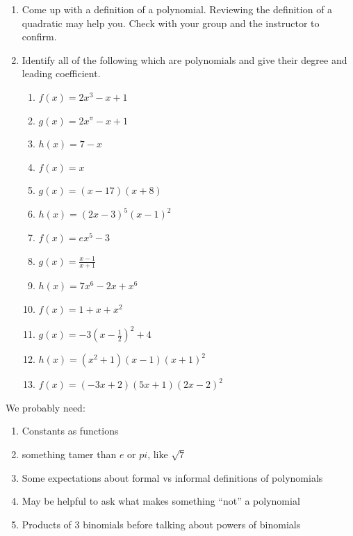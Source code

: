 \documentclass[noauthor]{ximera}
\begin{document}
\begin{problem}
\begin{enumerate}
    \item Come up with a definition of a polynomial. Reviewing the
    definition of a quadratic may help you. Check with your group
    and the instructor to confirm.
    \item Identify all of the following which are polynomials 
    and give their degree and leading coefficient.
    \begin{enumerate}
        \item \(f\left(x\right)=2x^3-x+1\)
	    \item \(g\left(x\right)=2x^\pi-x+1\)
	    \item \(h\left(x\right)=7-x\)
	    \item \(f\left(x\right)=x\)
	    \item \(g\left(x\right)=\left(x-17\right)\left(x+8\right)\)
	    \item \(h\left(x\right)=\left(2x-3\right)^5\left(x-1\right)^2\)
	    \item \(f\left(x\right)= e x^5-3\)
	    \item \(g\left(x\right)=\frac{x-1}{x+1}\)
	    \item \(h\left(x\right)=7x^6-2x+x^6\)
	    \item \(f\left(x\right)=1+x+x^2\)
	    \item \(g\left(x\right)=-3\left(x-\frac{1}{2}\right)^2+4\)
	    \item \(h\left(x\right)=\left(x^2+1\right)\left(x-1\right)\left(x+1\right)^2\)
	    \item \(f\left(x\right)=\left(-3x+2\right)\left(5x+1\right)\left(2x-2\right)^2\) 
    \end{enumerate}
\end{enumerate}

\begin{instructorNotes}
    We probably need:
    \begin{enumerate}
        \item Constants as functions
        \item something tamer than \(e\) or \(pi\), like \(\sqrt{7}\)
        \item Some expectations about formal vs informal definitions of polynomials
        \item May be helpful to ask what makes something ``not'' a polynomial
        \item Products of 3 binomials before talking about powers of binomials
    \end{enumerate}
\end{instructorNotes}
\end{problem}
\end{document}
